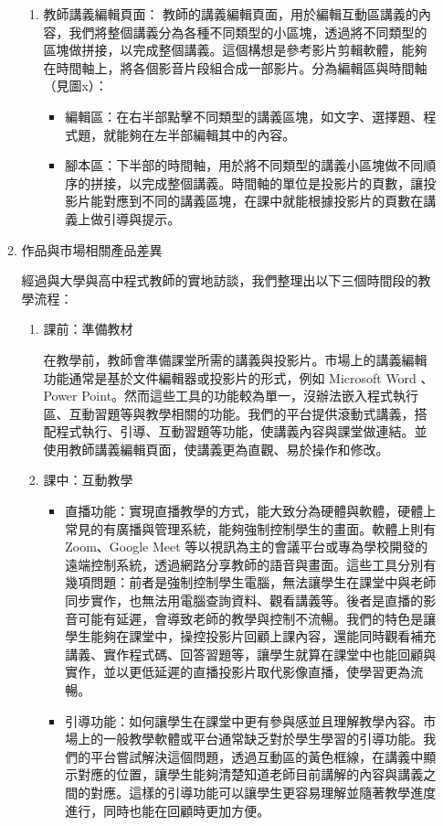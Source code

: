 \documentclass[12pt]{article}
\begin{document}
\begin{enumerate}
\begin{enumerate}
\begin{enumerate}[label=(\arabic*)]
          \item 教師講義編輯頁面：
          教師的講義編輯頁面，用於編輯互動區講義的內容，我們將整個講義分為各種不同類型的小區塊，透過將不同類型的區塊做拼接，以完成整個講義。這個構想是參考影片剪輯軟體，能夠在時間軸上，將各個影音片段組合成一部影片。分為編輯區與時間軸（見圖x）：
            \begin{itemize}
              \item 編輯區：在右半部點擊不同類型的講義區塊，如文字、選擇題、程式題，就能夠在左半部編輯其中的內容。
              \item 腳本區：下半部的時間軸，用於將不同類型的講義小區塊做不同順序的拼接，以完成整個講義。時間軸的單位是投影片的頁數，讓投影片能對應到不同的講義區塊，在課中就能根據投影片的頁數在講義上做引導與提示。
            \end{itemize}
        \end{enumerate}
      \item 作品與市場相關產品差異
        \par 經過與大學與高中程式教師的實地訪談，我們整理出以下三個時間段的教學流程：
        \begin{enumerate}[label=(\arabic*)]
          \setlength{\parindent}{2em}
          \item 課前：準備教材
            \par 在教學前，教師會準備課堂所需的講義與投影片。市場上的講義編輯功能通常是基於文件編輯器或投影片的形式，例如 Microsoft Word 、Power Point。然而這些工具的功能較為單一，沒辦法嵌入程式執行區、互動習題等與教學相關的功能。我們的平台提供滾動式講義，搭配程式執行、引導、互動習題等功能，使講義內容與課堂做連結。並使用教師講義編輯頁面，使講義更為直觀、易於操作和修改。
          \item 課中：互動教學
            \begin{itemize}
              \item 直播功能：實現直播教學的方式，能大致分為硬體與軟體，硬體上常見的有廣播與管理系統，能夠強制控制學生的畫面。軟體上則有 Zoom、Google Meet 等以視訊為主的會議平台或專為學校開發的遠端控制系統，透過網路分享教師的語音與畫面。這些工具分別有幾項問題：前者是強制控制學生電腦，無法讓學生在課堂中與老師同步實作，也無法用電腦查詢資料、觀看講義等。後者是直播的影音可能有延遲，會導致老師的教學與控制不流暢。我們的特色是讓學生能夠在課堂中，操控投影片回顧上課內容，還能同時觀看補充講義、實作程式碼、回答習題等，讓學生就算在課堂中也能回顧與實作，並以更低延遲的直播投影片取代影像直播，使學習更為流暢。
              \item 引導功能：如何讓學生在課堂中更有參與感並且理解教學內容。市場上的一般教學軟體或平台通常缺乏對於學生學習的引導功能。我們的平台嘗試解決這個問題，透過互動區的黃色框線，在講義中顯示對應的位置，讓學生能夠清楚知道老師目前講解的內容與講義之間的對應。這樣的引導功能可以讓學生更容易理解並隨著教學進度進行，同時也能在回顧時更加方便。

\end{itemize}
\end{enumerate}
\end{enumerate}
\end{enumerate}
\end{document}
